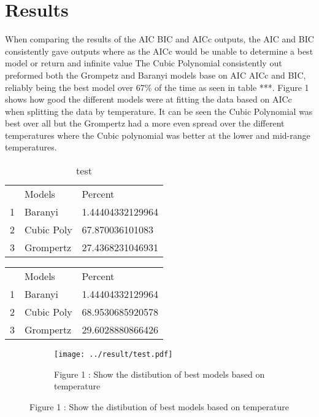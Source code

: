 \documentclass{article}
\begin{document}
	
	
	\section{Results}
	
	When comparing the results of the AIC BIC and AICc outputs, the AIC and BIC consistently gave outputs where as the AICc would be unable to determine a best model or return and infinite value 
	The Cubic Polynomial consistently out preformed both the Grompetz and Baranyi models base on AIC AICc and BIC, reliably being the best model over 67\% of the time as seen in table ***.
	Figure 1 shows how good the different models were at fitting the data based on AICc when splitting the data by temperature. It can be seen the Cubic Polynomial was best over all but the Grompertz had a more even spread over the different temperatures where the Cubic polynomial was better at the lower and mid-range temperatures.
	
	
	
	\begin{table}[h]
		\begin{tabular}{lll}
			& Models     & Percent          \\
			1 & Baranyi    & 1.44404332129964 \\
			2 & Cubic Poly & 67.870036101083  \\
			3 & Grompertz  & 27.4368231046931
		\end{tabular}
		\caption{test}
	\end{table}
	
	\begin{table}[h]
		\begin{tabular}{lll}
			& Models     & Percent          \\
			1 & Baranyi    & 1.44404332129964 \\
			2 & Cubic Poly & 68.9530685920578 \\
			3 & Grompertz  & 29.6028880866426
		\end{tabular}
	\end{table}
	
	
	\begin{figure}[htbp]
		\centering 
		\begin{subfigure}[b]{0.4\textwidth}
			\texttt{[image: ../result/test.pdf]}
			\caption{Figure 1 : Show the distibution of best models based on temperature}
			\label{fig:KWAMT plot}
		\end{subfigure}
	\end{figure}
	
\end{document}
